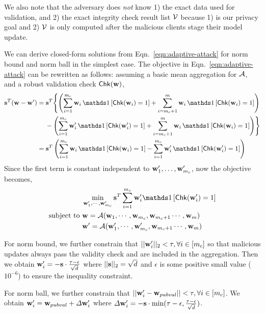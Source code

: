 We also note that the adversary does \emph{not} know 1) the exact data used for validation, and 2) the exact integrity check result list $\mathcal{V}$ because 1) is our privacy goal and 2) $\mathcal{V}$ is only computed after the malicious clients stage their model update.


We can derive closed-form solutions from Eqn.~\ref{eqn:adaptive-attack} for norm bound and norm ball in the simplest case.
The objective in Eqn.~\ref{eqn:adaptive-attack} can be rewritten as follows: assuming a basic mean aggregation for $\mathcal{A}$, and a robust validation check $\mathsf{Chk}(\mathbf{w})$,
\begin{align*}
\bfs^T (\bfw - \bfw') 
  &= \bfs^T \Biggl\{ \left( \sum_{i=1}^{\cor} \bfw_i\, \indicator{\msf{Chk}(\bfw_i) = 1} 
           + \sum_{i=\cor+1}^{m} \bfw_i\, \indicator{\msf{Chk}(\bfw_i) = 1} \right) \\
  &\quad\; - \left( \sum_{i=1}^{\cor} \bfw'_i\, \indicator{\msf{Chk}(\bfw'_i) = 1} 
           + \sum_{i=\cor+1}^{m} \bfw_i\, \indicator{\msf{Chk}(\bfw_i) = 1} \right) \Biggr\} \\
  &= \bfs^T \left( \sum_{i=1}^{\cor} \bfw_i\, \indicator{\msf{Chk}(\bfw_i) = 1} 
           - \sum_{i=1}^{\cor} \bfw'_i\, \indicator{\msf{Chk}(\bfw'_i) = 1} \right)
\end{align*}
Since the first term is constant independent to $\mathbf{w}'_1, \dots, \mathbf{w}'_{m_c}$, now the objective becomes,
\begin{align*}
&\min_{\bfw'_1,\cdots,\bfw'_{\cor}} \bfs^{T} \sum_{i=1}^{\cor} \bfw'_i \indicator{\msf{Chk}(\bfw'_i) = 1} \\ \nonumber
\text{subject to} ~&\bfw = \calA(\bfw_1, \cdots, \bfw_{\cor}, \bfw_{\cor+1} \cdots, \bfw_{m})\\ \nonumber
&\bfw' = \calA(\bfw'_1, \cdots, \bfw'_{\cor}, \bfw_{\cor+1} \cdots, \bfw_{m})
\end{align*}

For norm bound, we further constrain that $||\mathbf{w}'_i||_2 < \tau, \forall i \in [m_c]$ so that malicious updates always pass the validity check and are included in the aggregation.
Then we obtain $\mathbf{w}'_i = - \mathbf{s} \cdot \frac{\tau - \epsilon}{\sqrt{d}}$ where $||\mathbf{s}||_2 = \sqrt{d}$ and $\epsilon$ is some positive small value (\eg $10^{-6}$) to ensure the inequality constraint.

For norm ball, we further constrain that $||\mathbf{w}'_i - \mathbf{w}_{pubval}|| < \tau, \forall i \in [m_c]$. 
We obtain $\mathbf{w}'_i = \mathbf{w}_{pubval} + \Delta \mathbf{w}'_i$ where $\Delta \mathbf{w}'_i = -\mathbf{s} \cdot \min (\tau - \epsilon, \frac{\tau - \epsilon}{\sqrt{d}})$.

